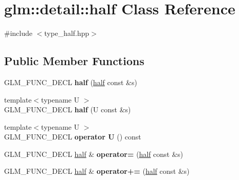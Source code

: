 \hypertarget{classglm_1_1detail_1_1half}{\section{glm\-:\-:detail\-:\-:half \-Class \-Reference}
\label{classglm_1_1detail_1_1half}
}


{\ttfamily \#include $<$type\-\_\-half.\-hpp$>$}

\subsection*{\-Public \-Member \-Functions}
\begin{DoxyCompactItemize}
\item 
\hypertarget{classglm_1_1detail_1_1half_a14fb2431e4900ad9da30306186975477}{\-G\-L\-M\-\_\-\-F\-U\-N\-C\-\_\-\-D\-E\-C\-L {\bfseries half} (\hyperlink{classglm_1_1detail_1_1half}{half} const \&s)}\label{classglm_1_1detail_1_1half_a14fb2431e4900ad9da30306186975477}

\item 
\hypertarget{classglm_1_1detail_1_1half_a537bce479b8d589b3f849edac71ce5f4}{{\footnotesize template$<$typename U $>$ }\\\-G\-L\-M\-\_\-\-F\-U\-N\-C\-\_\-\-D\-E\-C\-L {\bfseries half} (\-U const \&s)}\label{classglm_1_1detail_1_1half_a537bce479b8d589b3f849edac71ce5f4}

\item 
\hypertarget{classglm_1_1detail_1_1half_a22bf1e84f5baab5699595972585a8be5}{{\footnotesize template$<$typename U $>$ }\\\-G\-L\-M\-\_\-\-F\-U\-N\-C\-\_\-\-D\-E\-C\-L {\bfseries operator U} () const }\label{classglm_1_1detail_1_1half_a22bf1e84f5baab5699595972585a8be5}

\item 
\hypertarget{classglm_1_1detail_1_1half_a184ae21ab747a04d51ba40e757751261}{\-G\-L\-M\-\_\-\-F\-U\-N\-C\-\_\-\-D\-E\-C\-L \hyperlink{classglm_1_1detail_1_1half}{half} \& {\bfseries operator=} (\hyperlink{classglm_1_1detail_1_1half}{half} const \&s)}\label{classglm_1_1detail_1_1half_a184ae21ab747a04d51ba40e757751261}

\item 
\hypertarget{classglm_1_1detail_1_1half_aa4bf63310d4f1ee92671ac8dc34bb190}{\-G\-L\-M\-\_\-\-F\-U\-N\-C\-\_\-\-D\-E\-C\-L \hyperlink{classglm_1_1detail_1_1half}{half} \& {\bfseries operator+=} (\hyperlink{classglm_1_1detail_1_1half}{half} const \&s)}\label{classglm_1_1detail_1_1half_aa4bf63310d4f1ee92671ac8dc34bb190}


\end{DoxyCompactItemize}
